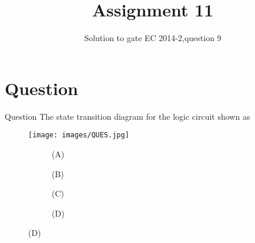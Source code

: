\documentclass{beamer}
\title{Assignment 11}
\subtitle{Solution to gate EC 2014-2,question 9}
\begin{document}
\begin{frame}{}
    \maketitle
\end{frame}

\section{Question}

\begin{frame}{Question}
       The state transition diagram for the logic circuit shown as
\begin{figure}[h]
    \centering
    \texttt{[image: images/QUES.jpg]}
\end{figure}
 
\begin{figure}[H]
    \centering
    \begin{subfigure}[h]{0.4\textwidth}
        \scalebox{0.4}{ }
        \caption{(A)}
    \end{subfigure}
    \hfill
    \begin{subfigure}[h]{0.4\textwidth}
        \scalebox{0.4}{ }
        \caption{(B)}
    \end{subfigure}
    \hfill
    \begin{subfigure}[h]{0.4\textwidth}
        \scalebox{0.4}{ }
        \caption{(C)}
    \end{subfigure}
    \hfill    
     \begin{subfigure}[h]{0.4\textwidth}
        \scalebox{0.4}{ }
        \caption{(D)}
    \end{subfigure}
\end{figure}
\end{frame}
\end{document}
